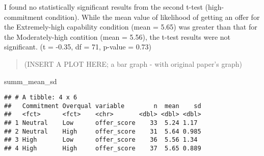 \documentclass[]{article}
\newenvironment{Shaded}{\begin{snugshade}}{\end{snugshade}}
\newcommand{\NormalTok}[1]{#1}
\begin{document}
I found no statistically significant results from the second t-test
(high-commitment condition). While the mean value of likelihood of
getting an offer for the Extremely-high capability condition (mean =
5.65) was greater than that for the Moderately-high contition (mean =
5.56), the t-test results were not significant. (t = -0.35, df = 71,
p-value = 0.73)

\begin{quote}
(INSERT A PLOT HERE; a bar graph - with original paper's graph)
\end{quote}

\begin{Shaded}
\begin{Highlighting}[]
\NormalTok{summ_mean_sd}
\end{Highlighting}
\end{Shaded}

\begin{verbatim}
## # A tibble: 4 x 6
##   Commitment Overqual variable        n  mean    sd
##   <fct>      <fct>    <chr>       <dbl> <dbl> <dbl>
## 1 Neutral    Low      offer_score    33  5.24 1.17 
## 2 Neutral    High     offer_score    31  5.64 0.985
## 3 High       Low      offer_score    36  5.56 1.34 
## 4 High       High     offer_score    37  5.65 0.889
\end{verbatim}
\end{document}
